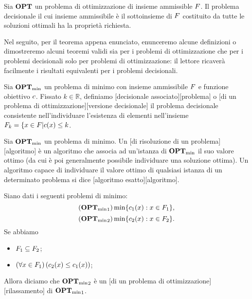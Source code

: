 \par Sia $\textbf{OPT}$ un problema di ottimizzazione di insieme ammissible $F$. Il problema decisionale il cui insieme ammissibile \`e il sottoinsieme di $F$ costituito da tutte le soluzioni ottimali ha la propriet\`a richiesta. \EndProof
\par Nel seguito, per il teorema appena enunciato, enunceremo alcune definizioni o dimostreremo alcuni teoremi validi sia per i problemi di ottimizzazione che per i problemi decisionali solo per problemi di ottimizzazione: il lettore ricaver\`a facilmente i risultati equivalenti per i problemi decisionali.
\begin{Definition}
	Sia ${\textbf{OPT}_{\min}}$ un problema di minimo con insieme ammissibile $F$ e funzione obiettivo $c$. Fissato $k \in \mathbb{R}$, definiamo
	[decisionale associato][problema] o
	[di un problema di ottimizzazione][versione decisionale]
	il problema decisionale consistente nell'individuare l'esistenza di elementi nell'insieme
	$F_k = \lbrace x \in F | c(x) \leq k$.
\end{Definition}
\begin{Definition}
	Sia ${\textbf{OPT}_{\min}}$ un problema di minimo. Un
	[di risoluzione di un problema][algoritmo] \`e
	un algoritmo che associa ad un'istanza di ${\textbf{OPT}_{\min}}$ il suo valore ottimo (da cui \`e poi generalmente possibile individuare una soluzione ottima). Un algoritmo capace di individuare il valore ottimo di qualsiasi istanza di un determinato problema si dice
	[algoritmo esatto][algoritmo].
\end{Definition}
\begin{Definition}
	Siano dati i seguenti problemi di minimo:
	$$({\textbf{OPT}_{\min}}_1) \min \lbrace c_1(x): x \in F_1 \rbrace,$$
	$$({\textbf{OPT}_{\min}}_2) \min \lbrace c_2(x): x \in F_2 \rbrace.$$
	Se abbiamo
	\begin{itemize}
		\item $F_1 \subseteq F_2$;
		\item $\left ( \forall x \in F_1 \right ) \left ( c_2(x) \leq c_1(x) \right )$;
	\end{itemize}
	Allora diciamo che ${\textbf{OPT}_{\min}}_2$ \`e un
	[di un problema di ottimizzazione][rilassamento]
	di ${\textbf{OPT}_{\min}}_1$.
\end{Definition}
